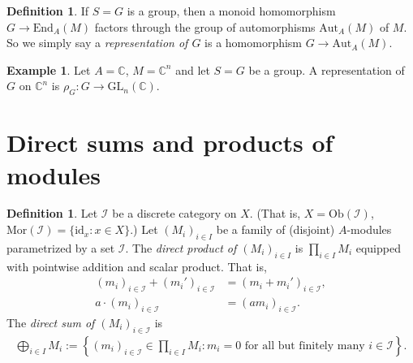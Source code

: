 \documentclass[12pt]{report}
\theoremstyle{plain}
\theoremstyle{remark}
\theoremstyle{definition}
\newtheorem{definition}[theorem]{Definition}
\newtheorem{example}[theorem]{Example}
\newcommand{\C}{\mathbb{C}}
\begin{document}
\begin{definition}

    If $S=G$ is a group, then a monoid homomorphism $G\rightarrow\mathrm{End}_A(M)$ factors through the group of automorphisms $\mathrm{Aut}_A(M)$ of $M$. So we simply say a \emph{representation of $G$} is a homomorphism $G\rightarrow\mathrm{Aut}_A(M)$.
\end{definition}

\begin{example}
    Let $A=\C$, $M=\C^n$ and let $S=G$ be a group. A representation of $G$ on $\C^n$ is $\rho_G:G\rightarrow\mathrm{GL}_n(\C)$.
\end{example}



\section{Direct sums and products of modules}
\begin{definition}
    Let $\mathcal{I}$ be a discrete category on $X$. (That is, $X=\mathrm{Ob}(\mathcal{I})$, $\mathrm{Mor}(\mathcal{I})=\{\mathrm{id}_x:x\in X\}$.) Let $(M_i)_{i\in I}$ be a family of (disjoint) $A$-modules parametrized by a set $\mathcal{I}$. The \emph{direct product of $(M_i)_{i\in I}$} is $\prod_{i\in I} M_i$ equipped with pointwise addition and scalar product. That is,
    \begin{align*}
        (m_i)_{i\in\mathcal{I}} + (m_i')_{i\in\mathcal{I}} &= (m_i+m_i')_{i\in\mathcal{I}} ,\\
        a\cdot (m_i)_{i\in\mathcal{I}} &= (am_i)_{i\in \mathcal{I}}.
    \end{align*}
    The \emph{direct sum of $(M_i)_{i\in\mathcal{I}}$} is
    \begin{align*}
        \bigoplus_{i\in I} M_i := \left\{(m_i)_{i\in\mathcal{I}}\in \prod_{i\in I}M_i : m_i=0\text{ for all but finitely many }i\in\mathcal{I}\right\}.
    \end{align*}
\end{definition}
\end{document}
